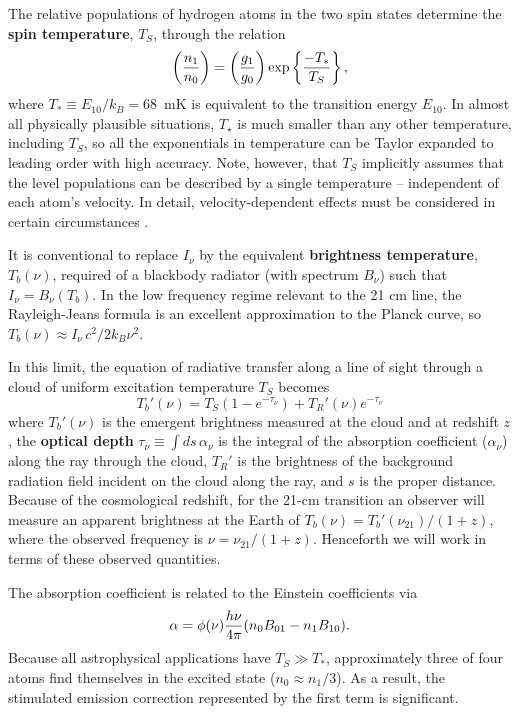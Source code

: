 The relative populations of hydrogen atoms in the two spin states determine the {\bf spin temperature}, $T_S$, through the relation
\begin{equation}
\left({n_1\over n_0}\right)=\left({g_1 \over g_0}\right)
\exp\left\{ {-T_*\over T_S}\right\}, 
\end{equation}
where $T_* \equiv E_{10} /k_B=68$~mK is equivalent to the transition energy $E_{10}$. In almost all physically plausible situations,  $T_\star$ is much smaller than any other temperature, including $T_S$, so all the exponentials in temperature can be Taylor expanded to leading order with high accuracy. Note, however, that $T_S$ implicitly assumes that the level populations can be described by a single temperature -- independent of each atom's velocity. In detail, velocity-dependent effects must be considered in certain circumstances \cite{hirata07}.

It is conventional to replace $I_{\nu}$ by the equivalent {\bf brightness temperature}, $T_b(\nu)$, required of a blackbody radiator (with spectrum $B_{\nu}$) such that $I_{\nu}=B_{\nu}(T_b)$. In the low frequency regime relevant to the 21 cm line, the Rayleigh-Jeans formula is an excellent approximation to the Planck curve, so $T_b(\nu)\approx I_{\nu} \, c^2/2k_B{\nu}^2$.

In this limit, the equation of radiative transfer  along a line of sight through a cloud of uniform excitation temperature $T_S$ becomes
\begin{equation}
T_b'(\nu) = T_{S}(1-e^{-\tau_{\nu}})+T_R'(\nu)e^{-\tau_{\nu}}
\label{eq:rad_trans}
\end{equation}
where $T_b'(\nu)$ is the emergent brightness measured at the cloud and at redshift $z$, the {\bf optical depth}  $\tau_\nu \equiv \int d s \, \alpha_{\nu}$ is the integral of the absorption coefficient ($\alpha_{\nu}$)  along the ray through the cloud, $T_R'$ is the brightness of the background radiation field incident on the cloud along the ray, and $s$ is the proper distance. Because of the cosmological redshift, for the 21-cm transition an observer will measure an apparent brightness at the Earth of $T_b(\nu) = T_b'(\nu_{21})/(1+z)$, where the observed frequency is $\nu=\nu_{21}/(1+z)$. Henceforth we will work in terms of these observed quantities.

The absorption coefficient is related to the Einstein coefficients via
\begin{equation}
\alpha = \phi(\nu) {h \nu \over 4 \pi} (n_0 B_{01} - n_1 B_{10}).
\end{equation}
Because all astrophysical  applications have $T_S \gg T_*$, approximately three of four atoms find themselves in the excited state ($n_0 \approx n_1/3$).  As a result, the stimulated emission correction represented by the first term is significant.  

